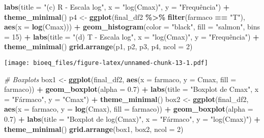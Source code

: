 \documentclass[
]{article}
\newenvironment{Shaded}{\begin{snugshade}}{\end{snugshade}}
\newcommand{\AttributeTok}[1]{\textcolor[rgb]{0.13,0.29,0.53}{#1}}
\newcommand{\CommentTok}[1]{\textcolor[rgb]{0.56,0.35,0.01}{\textit{#1}}}
\newcommand{\DecValTok}[1]{\textcolor[rgb]{0.00,0.00,0.81}{#1}}
\newcommand{\FloatTok}[1]{\textcolor[rgb]{0.00,0.00,0.81}{#1}}
\newcommand{\FunctionTok}[1]{\textcolor[rgb]{0.13,0.29,0.53}{\textbf{#1}}}
\newcommand{\NormalTok}[1]{#1}
\newcommand{\OtherTok}[1]{\textcolor[rgb]{0.56,0.35,0.01}{#1}}
\newcommand{\SpecialCharTok}[1]{\textcolor[rgb]{0.81,0.36,0.00}{\textbf{#1}}}
\newcommand{\StringTok}[1]{\textcolor[rgb]{0.31,0.60,0.02}{#1}}
\begin{document}
\begin{Shaded}
\begin{Highlighting}[]
  \FunctionTok{labs}\NormalTok{(}\AttributeTok{title =} \StringTok{"(c) R {-} Escala log"}\NormalTok{, }\AttributeTok{x =} \StringTok{"log(Cmax)"}\NormalTok{, }\AttributeTok{y =} \StringTok{"Frequência"}\NormalTok{) }\SpecialCharTok{+}
  \FunctionTok{theme\_minimal}\NormalTok{()}
\NormalTok{p4 }\OtherTok{\textless{}{-}} \FunctionTok{ggplot}\NormalTok{(final\_df2 }\SpecialCharTok{\%\textgreater{}\%} \FunctionTok{filter}\NormalTok{(farmaco }\SpecialCharTok{==} \StringTok{"T"}\NormalTok{), }\FunctionTok{aes}\NormalTok{(}\AttributeTok{x =} \FunctionTok{log}\NormalTok{(Cmax))) }\SpecialCharTok{+}
  \FunctionTok{geom\_histogram}\NormalTok{(}\AttributeTok{color =} \StringTok{"black"}\NormalTok{, }\AttributeTok{fill =} \StringTok{"salmon"}\NormalTok{, }\AttributeTok{bins =} \DecValTok{15}\NormalTok{) }\SpecialCharTok{+}
  \FunctionTok{labs}\NormalTok{(}\AttributeTok{title =} \StringTok{"(d) T {-} Escala log"}\NormalTok{, }\AttributeTok{x =} \StringTok{"log(Cmax)"}\NormalTok{, }\AttributeTok{y =} \StringTok{"Frequência"}\NormalTok{) }\SpecialCharTok{+}
  \FunctionTok{theme\_minimal}\NormalTok{()}
\FunctionTok{grid.arrange}\NormalTok{(p1, p2, p3, p4, }\AttributeTok{ncol =} \DecValTok{2}\NormalTok{)}
\end{Highlighting}
\end{Shaded}

\texttt{[image: bioeq\_files/figure-latex/unnamed-chunk-13-1.pdf]}

\begin{Shaded}
\begin{Highlighting}[]
\CommentTok{\# Boxplots}
\NormalTok{box1 }\OtherTok{\textless{}{-}} \FunctionTok{ggplot}\NormalTok{(final\_df2, }\FunctionTok{aes}\NormalTok{(}\AttributeTok{x =}\NormalTok{ farmaco, }\AttributeTok{y =}\NormalTok{ Cmax, }\AttributeTok{fill =}\NormalTok{ farmaco)) }\SpecialCharTok{+}
  \FunctionTok{geom\_boxplot}\NormalTok{(}\AttributeTok{alpha =} \FloatTok{0.7}\NormalTok{) }\SpecialCharTok{+}
  \FunctionTok{labs}\NormalTok{(}\AttributeTok{title =} \StringTok{"Boxplot de Cmax"}\NormalTok{, }\AttributeTok{x =} \StringTok{"Fármaco"}\NormalTok{, }\AttributeTok{y =} \StringTok{"Cmax"}\NormalTok{) }\SpecialCharTok{+}
  \FunctionTok{theme\_minimal}\NormalTok{()}
\NormalTok{box2 }\OtherTok{\textless{}{-}} \FunctionTok{ggplot}\NormalTok{(final\_df2, }\FunctionTok{aes}\NormalTok{(}\AttributeTok{x =}\NormalTok{ farmaco, }\AttributeTok{y =} \FunctionTok{log}\NormalTok{(Cmax), }\AttributeTok{fill =}\NormalTok{ farmaco)) }\SpecialCharTok{+}
  \FunctionTok{geom\_boxplot}\NormalTok{(}\AttributeTok{alpha =} \FloatTok{0.7}\NormalTok{) }\SpecialCharTok{+}
  \FunctionTok{labs}\NormalTok{(}\AttributeTok{title =} \StringTok{"Boxplot de log(Cmax)"}\NormalTok{, }\AttributeTok{x =} \StringTok{"Fármaco"}\NormalTok{, }\AttributeTok{y =} \StringTok{"log(Cmax)"}\NormalTok{) }\SpecialCharTok{+}
  \FunctionTok{theme\_minimal}\NormalTok{()}
\FunctionTok{grid.arrange}\NormalTok{(box1, box2, }\AttributeTok{ncol =} \DecValTok{2}\NormalTok{)}
\end{Highlighting}
\end{Shaded}
\end{document}
